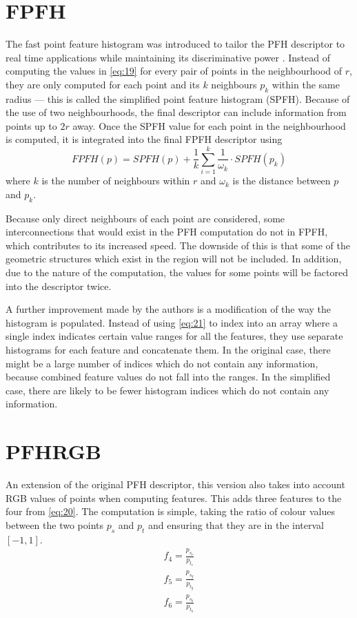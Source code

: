 \documentclass[11pt,a4paper]{kth-mag}
\begin{document}
\section{FPFH}
The fast point feature histogram was introduced to tailor the PFH descriptor to
real time applications while maintaining its discriminative power
\cite{rusu2009fast}. Instead of computing the values in \eqref{eq:19}
for every pair of points in the neighbourhood of $r$, they are only computed for
each point and its $k$ neighbours $p_k$ within the same radius --- this is
called the simplified point feature histogram (SPFH). Because of the use of two
neighbourhoods, the final descriptor can include information from points up to
$2r$ away. Once the SPFH value for each point in the neighbourhood is computed,
it is integrated into the final FPFH descriptor using
\begin{equation}
  \label{eq:20}
  FPFH(p)=SPFH(p)+\frac{1}{k}\sum^k_{i=1}\frac{1}{\omega_k}\cdot SPFH(p_k)
\end{equation}
where $k$ is the number of neighbours within $r$ and $\omega_k$ is the distance
between $p$ and $p_k$.

Because only direct neighbours of each point are considered, some
interconnections that would exist in the PFH computation do not in FPFH, which
contributes to its increased speed. The downside of this is that some of the
geometric structures which exist in the region will not be included. In
addition, due to the nature of the computation, the values for some points will
be factored into the descriptor twice.

A further improvement made by the authors is a modification of the way the
histogram is populated. Instead of using \eqref{eq:21} to index into
an array where a single index indicates certain value ranges for all the
features, they use separate histograms for each feature and concatenate them.
In the original case, there might be a large number of indices which do not
contain any information, because combined feature values do not fall into the
ranges. In the simplified case, there are likely to be fewer histogram indices
which do not contain any information.
\section{PFHRGB}
An extension of the original PFH descriptor, this version also takes into
account RGB values of points when computing features. This adds three features
to the four from \eqref{eq:20}. The computation is simple, taking the
ratio of colour values between the two points $p_s$ and $p_t$ and ensuring that
they are in the interval $\left[-1,1\right]$.
\begin{align}
  \label{eq:22}
  f_4=\frac{p_{s_r}}{p_{t_r}}\\
  f_5=\frac{p_{s_g}}{p_{t_g}}\\
  f_6=\frac{p_{s_b}}{p_{t_b}}
\end{align}
\end{document}
